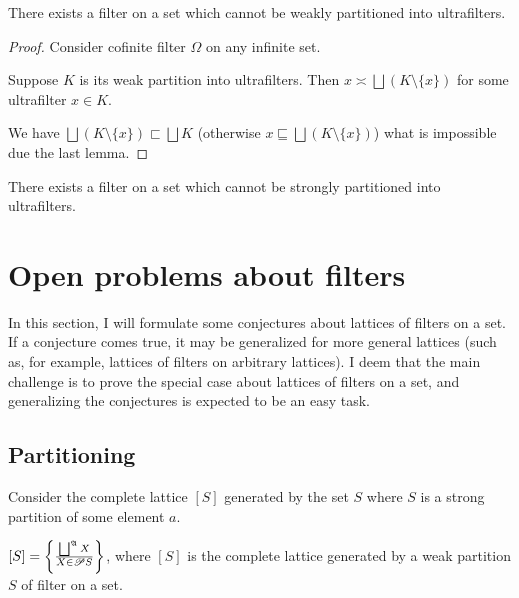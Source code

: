 \begin{example}
There exists a filter on a set which cannot be weakly partitioned
into ultrafilters.\end{example}
\begin{proof}
Consider cofinite filter $\Omega$ on any infinite set.

Suppose $K$ is its weak partition into ultrafilters. Then $x\asymp\bigsqcup(K\setminus\{x\})$
for some ultrafilter $x\in K$.

We have $\bigsqcup(K\setminus\{x\})\sqsubset\bigsqcup K$ (otherwise
$x\sqsubseteq\bigsqcup(K\setminus\{x\})$) what is impossible due
the last lemma.\end{proof}
\begin{cor}
There exists a filter on a set which cannot be strongly partitioned
into ultrafilters.
\end{cor}

\section{Open problems about filters}

In this section, I will formulate some conjectures about lattices
of filters on a set. If a conjecture comes true, it may be generalized
for more general lattices (such as, for example, lattices of filters
on arbitrary lattices). I deem that the main challenge is to prove
the special case about lattices of filters on a set, and generalizing
the conjectures is expected to be an easy task.


\subsection{Partitioning}

Consider the complete lattice $[S]$ generated by the set $S$ where
$S$ is a strong partition of some element $a$.
\begin{conjecture}
$[S]=\left\{ \frac{\bigsqcup^{\mathfrak{A}}X}{X\in\mathscr{P} S}\right\}$, where
$[S]$ is the complete lattice generated by a weak partition $S$
of filter on a set.
\end{conjecture}


